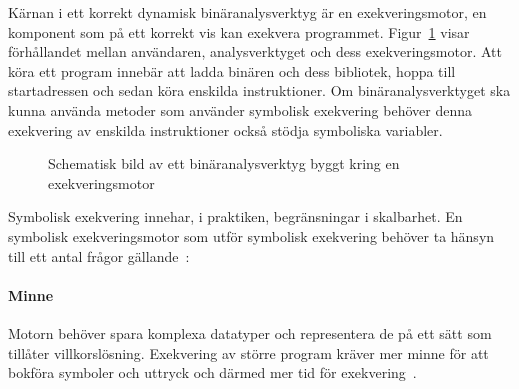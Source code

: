 
Kärnan i ett korrekt dynamisk binäranalysverktyg är en exekveringsmotor,
en komponent som på ett korrekt vis kan exekvera programmet.
Figur~\ref{schematic} visar förhållandet mellan användaren, analysverktyget och
dess exekveringsmotor. Att köra ett program innebär att ladda binären och dess
bibliotek, hoppa till startadressen och sedan köra enskilda instruktioner. Om
binäranalysverktyget ska kunna använda metoder som använder symbolisk
exekvering behöver denna exekvering av enskilda instruktioner också stödja
symboliska variabler.


\begin{figure}[H]
    \centering
    \caption{ Schematisk bild av ett binäranalysverktyg byggt kring en exekveringsmotor}\label{schematic}
\end{figure}

Symbolisk exekvering innehar, i praktiken, begränsningar i skalbarhet. En
symbolisk exekveringsmotor som utför symbolisk exekvering behöver ta hänsyn
till ett antal frågor gällande~\cite{survey_symb_exc}:

\paragraph{Minne} Motorn behöver spara komplexa datatyper och representera de
på ett sätt som tillåter villkorslösning. Exekvering av större program kräver
mer minne för att bokföra symboler och uttryck och därmed mer tid för
exekvering~\cite{survey_symb_exc}.


